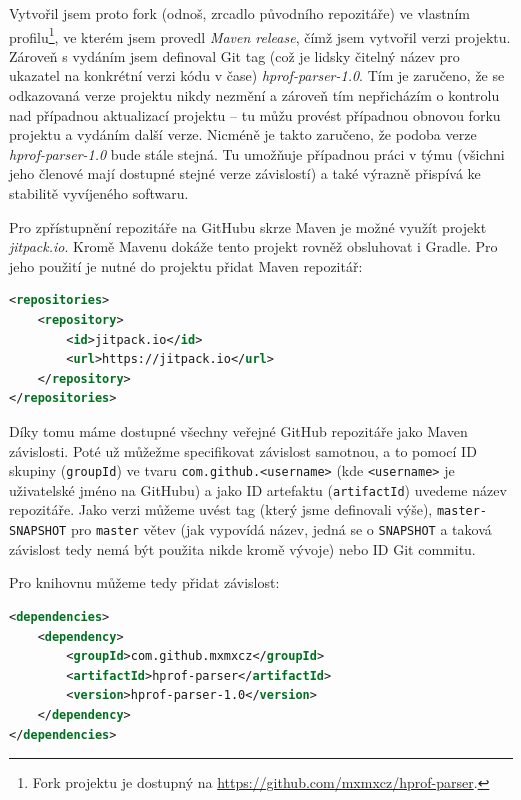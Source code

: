 Vytvořil jsem proto fork (odnoš, zrcadlo původního repozitáře) ve vlastním profilu\footnote{Fork projektu je dostupný na \url{https://github.com/mxmxcz/hprof-parser}.}, ve kterém jsem provedl \textit{Maven release}, čímž jsem vytvořil verzi projektu. Zároveň s vydáním jsem definoval Git tag (což je lidsky čitelný název pro ukazatel na konkrétní verzi kódu v čase) \textit{hprof-parser-1.0}. Tím je zaručeno, že se odkazovaná verze projektu nikdy nezmění a zároveň tím nepřicházím o kontrolu nad případnou aktualizací projektu -- tu můžu provést případnou obnovou forku projektu a vydáním další verze. Nicméně je takto zaručeno, že podoba verze \textit{hprof-parser-1.0} bude stále stejná. Tu umožňuje případnou práci v týmu (všichni jeho členové mají dostupné stejné verze závislostí) a také výrazně přispívá ke stabilitě vyvíjeného softwaru.

Pro zpřístupnění repozitáře na GitHubu skrze Maven je možné využít projekt \textit{jitpack.io}. Kromě Mavenu dokáže tento projekt rovněž obsluhovat i Gradle. Pro jeho použití je nutné do projektu přidat Maven repozitář:

\begin{lstlisting}[caption={Definování Jitpack repozitáře v Mavenu}, frame={single}, language={xml}]
<repositories>
    <repository>
        <id>jitpack.io</id>
        <url>https://jitpack.io</url>
    </repository>
</repositories>
\end{lstlisting}

Díky tomu máme dostupné všechny veřejné GitHub repozitáře jako Maven závislosti. Poté už můžežme specifikovat závislost samotnou, a to pomocí ID skupiny (\texttt{groupId}) ve tvaru \texttt{com.github.<username>} (kde \texttt{<username>} je uživatelské jméno na GitHubu) a jako ID artefaktu (\texttt{artifactId}) uvedeme název repozitáře. Jako verzi můžeme uvést tag (který jsme definovali výše), \texttt{master-SNAPSHOT} pro \texttt{master} větev (jak vypovídá název, jedná se o \texttt{SNAPSHOT} a taková závislost tedy nemá být použita nikde kromě vývoje) nebo ID Git commitu.

Pro knihovnu můžeme tedy přidat závislost:
\begin{lstlisting}[caption={Definování závislosti v Mavenu}, frame={single}, language={xml}]
<dependencies>
    <dependency>
        <groupId>com.github.mxmxcz</groupId>
        <artifactId>hprof-parser</artifactId>
        <version>hprof-parser-1.0</version>
    </dependency>
</dependencies>
\end{lstlisting}


